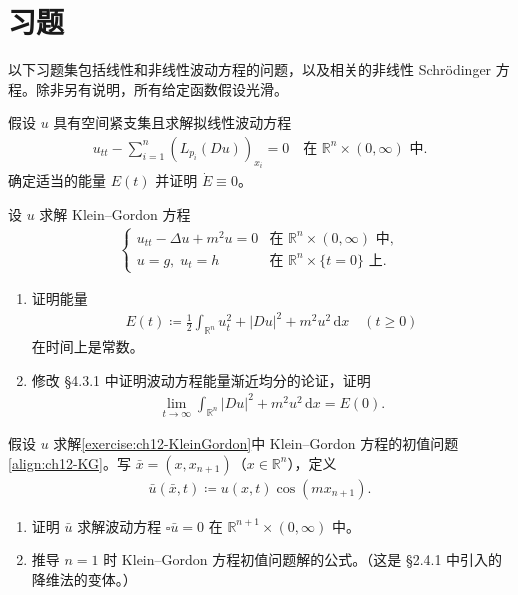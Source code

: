 \documentclass[../../main.tex]{subfiles}
\begin{document}
\section{习题}\label{section:ch12-习题}

以下习题集包括线性和非线性波动方程的问题，以及相关的非线性 Schr\"odinger 方程。除非另有说明，所有给定函数假设光滑。

\begin{exercise}\label{exercise:ch12-能量}
假设 $u$ 具有空间紧支集且求解拟线性波动方程
\begin{align*}
u_{tt}-\sum_{i=1}^n(L_{p_i}(Du))_{x_i}=0 \quad \text{在 } \mathbb{R}^n\times(0,\infty) \text{ 中}.
\end{align*}
确定适当的能量 $E(t)$ 并证明 $\dot{E}\equiv 0$。
\end{exercise}

\begin{exercise}\label{exercise:ch12-KleinGordon}
设 $u$ 求解 Klein--Gordon 方程
\begin{align}
\begin{cases}
u_{tt}-\Delta u+m^2u=0 & \text{在 } \mathbb{R}^n\times(0,\infty) \text{ 中},\\
u=g,\;u_t=h & \text{在 } \mathbb{R}^n\times\{t=0\} \text{ 上}.
\end{cases}
\label{align:ch12-KG}
\end{align}
\begin{enumerate}[(1)]
\item 证明能量
\begin{align*}
E(t)\coloneqq\frac{1}{2}\int_{\mathbb{R}^n}u_t^2+|Du|^2+m^2u^2\,\mathrm{d}x \quad (t\geqslant 0)
\end{align*}
在时间上是常数。
\item 修改 \S4.3.1 中证明波动方程能量渐近均分的论证，证明
\begin{align*}
\lim_{t\to\infty}\int_{\mathbb{R}^n}|Du|^2+m^2u^2\,\mathrm{d}x=E(0).
\end{align*}
\end{enumerate}
\end{exercise}

\begin{exercise}\label{exercise:ch12-KG降维}
假设 $u$ 求解\cref{exercise:ch12-KleinGordon}中 Klein--Gordon 方程的初值问题\eqref{align:ch12-KG}。写 $\bar{x}=(x,x_{n+1})$（$x\in\mathbb{R}^n$），定义
\begin{align*}
\bar{u}(\bar{x},t)\coloneqq u(x,t)\cos(mx_{n+1}).
\end{align*}
\begin{enumerate}[(1)]
\item 证明 $\bar{u}$ 求解波动方程 $\square\bar{u}=0$ 在 $\mathbb{R}^{n+1}\times(0,\infty)$ 中。
\item 推导 $n=1$ 时 Klein--Gordon 方程初值问题解的公式。（这是 \S2.4.1 中引入的降维法的变体。）
\end{enumerate}
\end{exercise}
\end{document}

